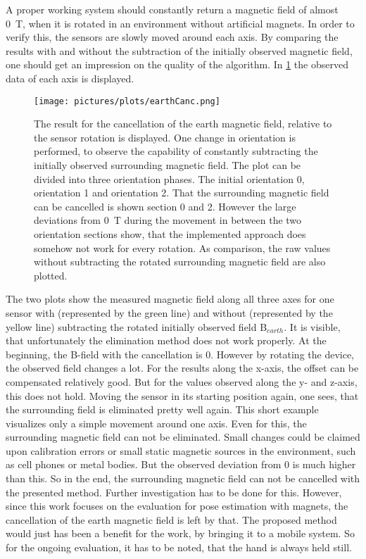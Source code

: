 A proper working system should constantly return a magnetic field of almost \SI{0}{\tesla}, when it is rotated in an environment without artificial magnets. In order to verify this, the sensors are slowly moved around each axis. By comparing the results with and without the subtraction of the initially observed magnetic field, one should get an impression on the quality of the algorithm. In \ref{fig:earthCancelRes} the observed data of each axis is displayed.

\begin{figure}[h]
\centering
\texttt{[image: pictures/plots/earthCanc.png]} 
\caption{The result for the cancellation of the earth magnetic field, relative to the sensor rotation is displayed. One change in orientation is performed, to observe the capability of constantly subtracting the initially observed surrounding magnetic field. The plot can be divided into three orientation phases. The initial orientation 0, orientation 1 and orientation 2. That the surrounding magnetic field can be cancelled is shown section 0 and 2. However the large deviations from \SI{0}{\tesla} during the movement in between the two orientation sections show, that the implemented approach does somehow not work for every rotation. As comparison, the raw values without subtracting the rotated surrounding magnetic field are also plotted.}
\label{fig:earthCancelRes}
\end{figure}

The two plots show the measured magnetic field along all three axes for one sensor with (represented by the green line) and without (represented by the yellow line) subtracting the rotated initially observed field $ \mathrm{B}_{earth} $. It is visible, that unfortunately the elimination method does not work properly. At the beginning, the B-field with the cancellation is 0. However by rotating the device, the observed field changes a lot. For the results along the x-axis, the offset can be compensated relatively good. But for the values observed along the y- and z-axis, this does not hold. Moving the sensor in its starting position again, one sees, that the surrounding field is eliminated pretty well again. This short example visualizes only a simple movement around one axis. Even for this, the surrounding magnetic field can not be eliminated. Small changes could be claimed upon calibration errors or small static magnetic sources in the environment, such as cell phones or metal bodies. But the observed deviation from 0 is much higher than this. So in the end, the surrounding magnetic field can not be cancelled with the presented method. Further investigation has to be done for this. However, since this work focuses on the evaluation for pose estimation with magnets, the cancellation of the earth magnetic field is left by that. The proposed method would just has been a benefit for the work, by bringing it to a mobile system. So for the ongoing evaluation, it has to be noted, that the hand is always held still. 


